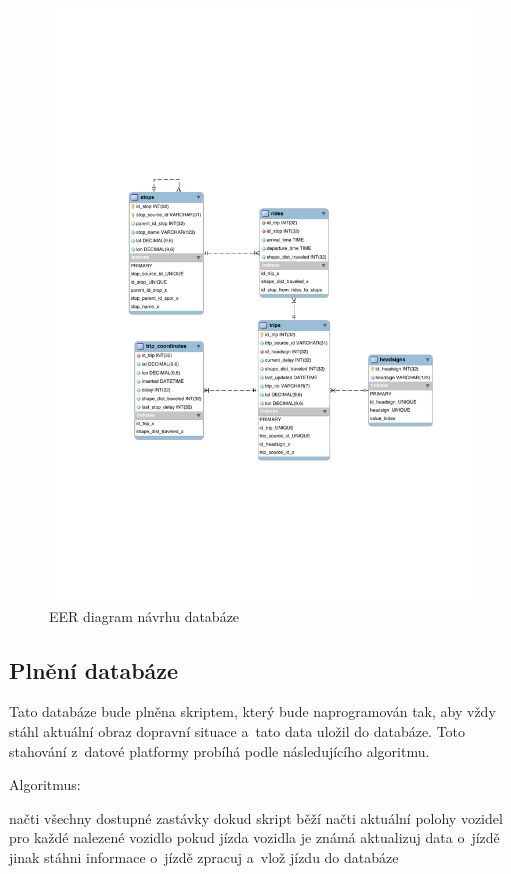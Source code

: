 \begin{figure}[p]\centering
\includegraphics[width=\linewidth]{../img/eer_database}
\caption{EER diagram návrhu databáze}
\label{fig:EER}
\end{figure}

\subsection{Plnění databáze}


Tato databáze bude plněna skriptem, který bude naprogramován tak, aby vždy stáhl aktuální obraz dopravní situace a~tato data uložil do databáze. Toto stahování z~datové platformy probíhá podle následujícího algoritmu.


\bigbreak


Algoritmus:
\begin{code}[frame=none]
načti všechny dostupné zastávky
dokud skript běží
  načti aktuální polohy vozidel
  pro každé nalezené vozidlo
    pokud jízda vozidla je známá
      aktualizuj data o~jízdě
    jinak
      stáhni informace o~jízdě
    zpracuj a~vlož jízdu do databáze
\end{code}


